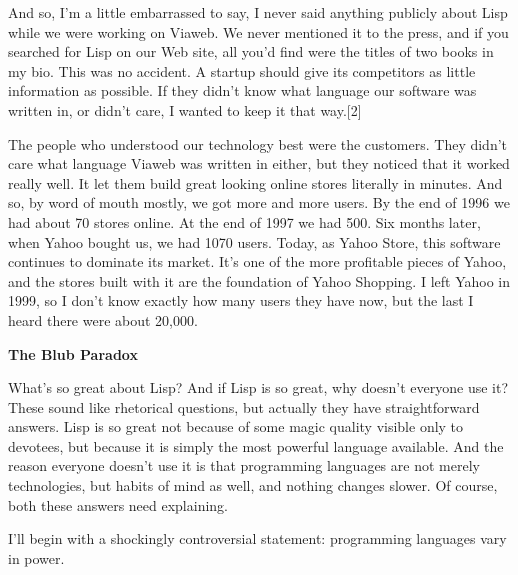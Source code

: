 And so, I'm a little embarrassed to say,
                  I never said anything publicly about Lisp while we were
                  working on Viaweb. We never mentioned it to the press, and if
                  you searched for Lisp on our Web site, all you'd find were the
                  titles of two books in my bio. This was no accident. A startup
                  should give its competitors as little information as possible.
                  If they didn't know what language our software was written in,
                  or didn't care, I wanted to keep it that way.[2]

The
                  people who understood our technology best were the customers.
                  They didn't care what language Viaweb was written in either,
                  but they noticed that it worked really well. It let them build
                  great looking online stores literally in minutes. And so, by
                  word of mouth mostly, we got more and more users. By the end
                  of 1996 we had about 70 stores online. At the end of 1997 we
                  had 500. Six months later, when Yahoo bought us, we had 1070
                  users. Today, as Yahoo Store, this software continues to
                  dominate its market. It's one of the more profitable pieces of
                  Yahoo, and the stores built with it are the foundation of
                  Yahoo Shopping. I left Yahoo in 1999, so I don't know exactly
                  how many users they have now, but the last I heard there were
                  about 20,000.


                  \textbf{The Blub Paradox}

What's so great about Lisp?
                  And if Lisp is so great, why doesn't everyone use it? These
                  sound like rhetorical questions, but actually they have
                  straightforward answers. Lisp is so great not because of some
                  magic quality visible only to devotees, but because it is
                  simply the most powerful language available. And the reason
                  everyone doesn't use it is that programming languages are not
                  merely technologies, but habits of mind as well, and nothing
                  changes slower. Of course, both these answers need
                  explaining.

I'll begin with a shockingly
                  controversial statement: programming languages vary in
                  power.


